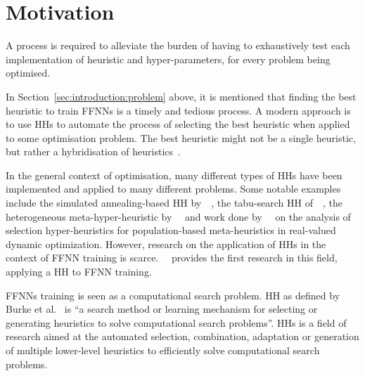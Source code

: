 \section{Motivation}\label{sec:introduction:motivation}

A process is required to alleviate the burden of having to exhaustively test each implementation of heuristic and hyper-parameters, for every problem being optimised.

In Section~\ref{sec:introduction:problem} above, it is mentioned that finding the best heuristic to train \acp{FFNN} is a timely and tedious process. A modern approach is to use \acp{HH} to automate the process of selecting the best heuristic when applied to some optimisation problem. The best heuristic might not be a single heuristic, but rather a hybridisation of heuristics~\cite{ref:pillay:2015}.

In the general context of optimisation, many different types of \acp{HH} have been implemented and applied to many different problems. Some notable examples include the simulated annealing-based \acs{HH} by~\citeauthor{ref:dowsland:2007}~\cite{ref:dowsland:2007}, the tabu-search \acs{HH} of~\citeauthor{ref:burke:2010}~\cite{ref:burke:2010}, the heterogeneous meta-hyper-heuristic by~\citeauthor{ref:grobler:2012}~\cite{ref:grobler:2012} and work done by~\citeauthor{ref:vanderstockt:2018}~\cite{ref:vanderstockt:2018} on the analysis of selection hyper-heuristics for population-based meta-heuristics in real-valued dynamic optimization. However, research on the application of \acp{HH} in the context of \acs{FFNN} training is scarce.~\citeauthor{ref:nel:2021}~\cite{ref:nel:2021} provides the first research in this field, applying a \acs{HH} to \acs{FFNN} training.

\acp{FFNN} training is seen as a computational search problem. \acf{HH} as defined by Burke et al.~\cite{ref:burke:2010} is ``a search method or learning mechanism for selecting or generating heuristics to solve computational search problems''. \acp{HH} is a field of research aimed at the automated selection, combination, adaptation or generation of multiple lower-level heuristics to efficiently solve computational search problems.

